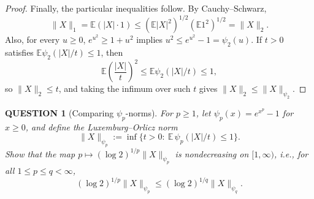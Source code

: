 \documentclass[12pt]{article}
\renewcommand{\(}{\left(}%
\renewcommand{\)}{\right)}%
\renewcommand{\[}{\left[}%
\renewcommand{\]}{\right]}%
\newtheorem{question}{QUESTION}[section]}
\newtheorem{proof}{Proof.}}
\begin{document}
\begin{proof}
\medskip
Finally, the particular inequalities follow. By Cauchy--Schwarz,
\begin{equation*}
\|X\|_1=\mathbb{E}(|X|\cdot 1)\le (\mathbb{E}|X|^2)^{1/2}(\mathbb{E}1^2)^{1/2}=\|X\|_2.
\end{equation*}
Also, for every $u\ge 0$, $e^{u^2}\ge 1+u^2$ implies $u^2\le e^{u^2}-1=\psi_2(u)$. If $t>0$ satisfies $\mathbb{E}\psi_2(|X|/t)\le 1$, then
\begin{equation*}
\mathbb{E}\left(\frac{|X|}{t}\right)^2 \le \mathbb{E}\psi_2(|X|/t)\le 1,
\end{equation*}
so $\|X\|_2\le t$, and taking the infimum over such $t$ gives $\|X\|_2\le \|X\|_{\psi_2}$.
\end{proof}

\begin{question}[Comparing $\psi_p$-norms]
For $p\ge 1$, let $\psi_p(x)=e^{x^p}-1$ for $x\ge 0$, and define the Luxemburg--Orlicz norm
\begin{equation*}
\|X\|_{\psi_p}
:=\inf\Big\{t>0:\ \mathbb{E}\,\psi_p(|X|/t)\le 1\Big\}.
\end{equation*}
Show that the map $p\mapsto (\log 2)^{1/p}\|X\|_{\psi_p}$ is nondecreasing on $[1,\infty)$, i.e., for all $1\le p\le q<\infty$,
\begin{equation*}
(\log 2)^{1/p}\|X\|_{\psi_p}\le (\log 2)^{1/q}\|X\|_{\psi_q}.
\end{equation*}
\end{question}
\end{document}
